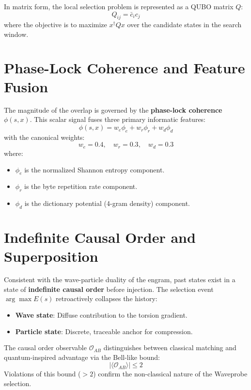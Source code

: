 \documentclass[11pt,a4paper]{article}
\begin{document}
In matrix form, the local selection problem is represented as a QUBO matrix $Q$:
\begin{equation}
Q_{ij} = \bar{c}_i c_j
\end{equation}
where the objective is to maximize $x^\dagger Q x$ over the candidate states in the search window.

\section{Phase-Lock Coherence and Feature Fusion}

The magnitude of the overlap is governed by the \textbf{phase-lock coherence} $\phi(s, x)$. This scalar signal fuses three primary informatic features:
\begin{equation}
\phi(s, x) = w_e \phi_e + w_r \phi_r + w_d \phi_d
\end{equation}
with the canonical weights:
\begin{equation}
w_e = 0.4, \quad w_r = 0.3, \quad w_d = 0.3
\end{equation}
where:
\begin{itemize}
    \item $\phi_e$ is the normalized Shannon entropy component.
    \item $\phi_r$ is the byte repetition rate component.
    \item $\phi_d$ is the dictionary potential (4-gram density) component.
\end{itemize}

\section{Indefinite Causal Order and Superposition}

Consistent with the wave-particle duality of the engram, past states exist in a state of \textbf{indefinite causal order} before injection. The selection event $\arg\max E(s)$ retroactively collapses the history:
\begin{itemize}
    \item \textbf{Wave state}: Diffuse contribution to the torsion gradient.
    \item \textbf{Particle state}: Discrete, traceable anchor for compression.
\end{itemize}

The causal order observable $\mathcal{O}_{AB}$ distinguishes between classical matching and quantum-inspired advantage via the Bell-like bound:
\begin{equation}
|\langle \mathcal{O}_{AB} \rangle| \leq 2
\end{equation}
Violations of this bound ($>2$) confirm the non-classical nature of the Waveprobe selection.
\end{document}
